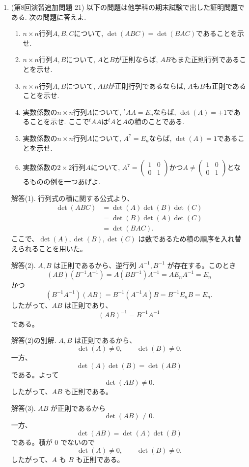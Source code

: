 \documentclass[dvipdfmx,a4paper,11pt]{article} %
\theoremstyle{definition}
\begin{document}
\begin{enumerate}[label=\textbf{問題}\arabic*.]
\item (第8回演習追加問題 21)  以下の問題は他学科の期末試験で出した証明問題である. 
 次の問題に答えよ. 
 \begin{enumerate}[label=(\arabic*)]
 \setlength{\parskip}{0cm} %
  \setlength{\itemsep}{0cm}
   \item $n\times n$行列$A, B, C$について, $\det(ABC) = \det(BAC)$であることを示せ.
    \item  $n\times n$行列$A, B$について, $A$と$B$が正則ならば, $AB$もまた正則行列であることを示せ. 
    \item $n\times n$行列$A, B$について, $AB$が正則行列であるならば, $A$も$B$も正則であることを示せ. 
 \item  実数係数の$n\times n$行列$A$について, $^{t}A A=E_n$ならば, $\det (A) = \pm 1$であることを示せ.  ここで$^{t}A A$は$^{t}A $と$A$の積のことである. 
     \item  実数係数の$n\times n$行列$A$について, $A^7=E_n$ならば, $\det (A) = 1$であることを示せ. 
    \item  実数係数の$2\times 2$行列$A$について, $A^7=\begin{pmatrix}  1&  0 \\  0 &1 \end{pmatrix}$かつ$A \neq \begin{pmatrix}  1&  0 \\  0 &1 \end{pmatrix}$となるものの例を一つあげよ. 
 \end{enumerate} 
 

解答(1).
行列式の積に関する公式より、
\begin{align*}
\det(ABC)
&=\det(A)\det(B)\det(C)\\
&=\det(B)\det(A)\det(C)\\
&=\det(BAC).
\end{align*}
ここで、$\det(A),\det(B),\det(C)$ は数であるため積の順序を入れ替えられることを用いた。

解答(2).
$A,B$ は正則であるから、逆行列 $A^{-1},B^{-1}$ が存在する。このとき
\[
(AB)(B^{-1}A^{-1})=A(BB^{-1})A^{-1}=AE_nA^{-1}=E_n
\]
かつ
\[
(B^{-1}A^{-1})(AB)=B^{-1}(A^{-1}A)B=B^{-1}E_nB=E_n.
\]
したがって、$AB$ は正則であり、
\[
(AB)^{-1}=B^{-1}A^{-1}
\]
である。

解答(2)の別解. 
$A,B$ は正則であるから、
\[
\det(A)\neq0,
\qquad
\det(B)\neq0.
\]
一方、
\[
\det(A)\det(B)=\det(AB)
\]
である。よって
\[
\det(AB)\neq0.
\]
したがって、$AB$ も正則である。



解答(3).
$AB$ が正則であるから
\[
\det(AB)\neq0.
\]
一方、
\[
\det(AB)=\det(A)\det(B)
\]
である。積が $0$ でないので
\[
\det(A)\neq0,
\qquad
\det(B)\neq0.
\]
したがって、$A$ も $B$ も正則である。


\end{enumerate}
\end{document}
